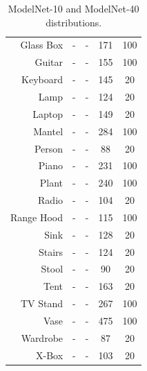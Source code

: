 \begin{table}
\begin{tabular}{rcccc}
    Glass Box & -	 & -	 & 171	& 100 \\
    Guitar	  & -	 & -	 & 155	& 100 \\
    Keyboard  & -	 & -	 & 145	& 20 \\
    Lamp	  & -	 & -	 & 124	& 20 \\
    Laptop	  & -	 & -	 & 149	& 20 \\
    Mantel	  & -	 & -	 & 284	& 100 \\
    Person	  & -	 & -	 & 88	& 20 \\
    Piano	  & -	 & -	 & 231	& 100 \\
    Plant	  & -	 & -	 & 240	& 100 \\
    Radio	  & -	 & -	 & 104  & 20 \\
    Range Hood & -	 & -	 & 115	& 100 \\
    Sink	  & -	 & -	 & 128	& 20 \\
    Stairs 	 & -	 & -	 & 124	& 20 \\
    Stool 	 & -	 & -	 & 90	& 20 \\
    Tent  	 & -	 & -	 & 163	& 20 \\
    TV Stand  & -	 & -	 & 267	& 100 \\
    Vase	 & -	 & -	 & 475	& 100 \\
    Wardrobe  & -	 & -	 & 87	& 20 \\
    X-Box	 & -	 & -	& 103	& 20 \\
    \bottomrule
    \end{tabular}
    \caption{ModelNet-10 and ModelNet-40 distributions.}
    \label{table:objrecog:modelnet_distribution}
\end{table}

